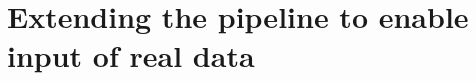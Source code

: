 















\section{Extending the pipeline to enable input of real data} \label{sec:extending-real-data}

\begin{comment}
Premise: Have a working pipeline to collect, train and render novel views from CARLA
Question: How can this pipeline be extended to enable input of real data?

\begin{itemize}
    \item How to collect images and camera poses from the car?
    \item Which changes had to be done to the pipeline to support this change?
\end{itemize}
\end{comment}



